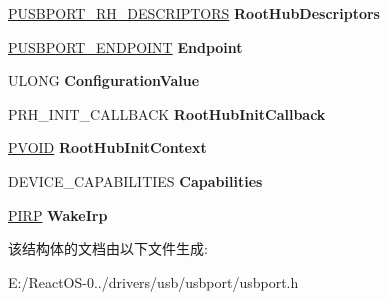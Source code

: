\begin{DoxyCompactItemize}
\item 
\mbox{\label{struct___u_s_b_p_o_r_t___r_h_d_e_v_i_c_e___e_x_t_e_n_s_i_o_n_ac3b049eb8345171562aedcef9b5f161f}} 
\hyperlink{struct___u_s_b_p_o_r_t___r_h___d_e_s_c_r_i_p_t_o_r_s}{P\+U\+S\+B\+P\+O\+R\+T\+\_\+\+R\+H\+\_\+\+D\+E\+S\+C\+R\+I\+P\+T\+O\+RS} {\bfseries Root\+Hub\+Descriptors}
\item 
\mbox{\label{struct___u_s_b_p_o_r_t___r_h_d_e_v_i_c_e___e_x_t_e_n_s_i_o_n_abe34396e7ee1854ded2b72473e8886a9}} 
\hyperlink{struct___u_s_b_p_o_r_t___e_n_d_p_o_i_n_t}{P\+U\+S\+B\+P\+O\+R\+T\+\_\+\+E\+N\+D\+P\+O\+I\+NT} {\bfseries Endpoint}
\item 
\mbox{\label{struct___u_s_b_p_o_r_t___r_h_d_e_v_i_c_e___e_x_t_e_n_s_i_o_n_a038e327e6adaf6ab75048f9d35ce2370}} 
U\+L\+O\+NG {\bfseries Configuration\+Value}
\item 
\mbox{\label{struct___u_s_b_p_o_r_t___r_h_d_e_v_i_c_e___e_x_t_e_n_s_i_o_n_a6e211db8d545426588f65dd304d15714}} 
P\+R\+H\+\_\+\+I\+N\+I\+T\+\_\+\+C\+A\+L\+L\+B\+A\+CK {\bfseries Root\+Hub\+Init\+Callback}
\item 
\mbox{\label{struct___u_s_b_p_o_r_t___r_h_d_e_v_i_c_e___e_x_t_e_n_s_i_o_n_a736cd3102e4ea4fe12e93d4f0eb06e88}} 
\hyperlink{interfacevoid}{P\+V\+O\+ID} {\bfseries Root\+Hub\+Init\+Context}
\item 
\mbox{\label{struct___u_s_b_p_o_r_t___r_h_d_e_v_i_c_e___e_x_t_e_n_s_i_o_n_aadacb161c1ab48179c45b15430482b39}} 
D\+E\+V\+I\+C\+E\+\_\+\+C\+A\+P\+A\+B\+I\+L\+I\+T\+I\+ES {\bfseries Capabilities}
\item 
\mbox{\label{struct___u_s_b_p_o_r_t___r_h_d_e_v_i_c_e___e_x_t_e_n_s_i_o_n_adeb9d39f2157b29032217a4ab7da0e14}} 
\hyperlink{interfacevoid}{P\+I\+RP} {\bfseries Wake\+Irp}
\end{DoxyCompactItemize}


该结构体的文档由以下文件生成\+:\begin{DoxyCompactItemize}
\item 
E\+:/\+React\+O\+S-\/0../drivers/usb/usbport/usbport.\+h\end{DoxyCompactItemize}
